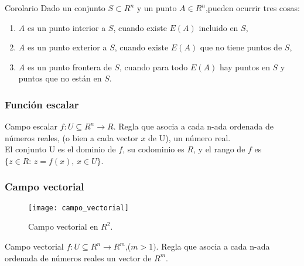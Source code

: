 \documentclass[a4paper, twoside]{article}
\numberwithin{equation}{section}
\numberwithin{figure}{section}
\numberwithin{table}{section}
\begin{document}
\begin{corolario*}{Corolario}
	Dado un conjunto $S\subset R^n$ y un punto $A\in R^n$,pueden ocurrir tres cosas:
	\begin{enumerate}
		\item $A$ es un punto interior a $S$, cuando existe $E(A)$ incluido en $S$,
		\item $A$ es un punto exterior a $S$, cuando existe $E(A)$ que no tiene puntos de $S$,
		\item $A$ es un punto frontera de $S$, cuando para todo $E(A)$ hay puntos en $S$ y puntos que no están en $S$.
	\end{enumerate}
\end{corolario*}

\subsubsection{Función escalar}
\begin{definicion*}{Campo escalar}
	$f:U\subseteq R^n \rightarrow R$. Regla que asocia a cada n-ada ordenada de números reales, (o bien a cada vector $x$ de U), un número real.\\
	
	El conjunto U es el dominio de $f$, su codominio es $R$, y el rango de $f$ es $\{z\in R:\, z=f\left(x\right),\, x\in U\}$.
\end{definicion*}

\subsubsection{Campo vectorial}
\begin{minipage}{0.3\textwidth}
	\begin{figure}[H]
		\centering
		\texttt{[image: campo\_vectorial]}
		\caption{Campo vectorial en $R^2$.}
	\end{figure}
\end{minipage}
\begin{minipage}{0.6\textwidth}
	\begin{definicion*}{Campo vectorial}
		$f:U\subseteq R^n \rightarrow R^m$,($m>1)$. Regla que asocia a cada n-ada ordenada de números reales un vector de $R^m$.\\
	\end{definicion*}
\end{minipage}
\end{document}
